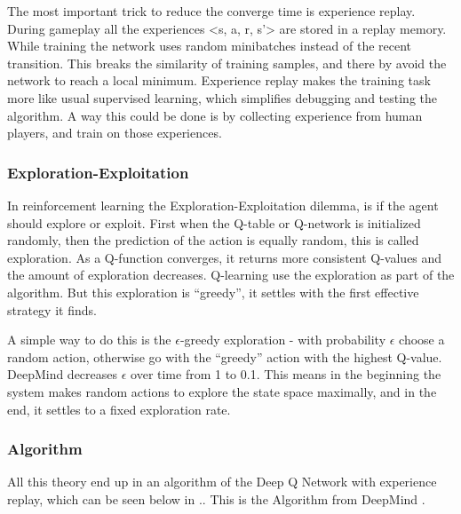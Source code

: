 The most important trick to reduce the converge time is experience replay. During gameplay all the experiences <s, a, r, s’> are stored in a replay memory. While training the network uses random minibatches instead of the recent transition. This breaks the similarity of training samples, and there by avoid the network to reach a local minimum. Experience replay makes the training task more like usual supervised learning, which simplifies debugging and testing the algorithm. A way this could be done is by collecting experience from human players, and train on those experiences.
  
\subsubsection{Exploration-Exploitation}
In reinforcement learning the Exploration-Exploitation dilemma, is if the agent should explore or exploit. First when the Q-table or Q-network is initialized randomly, then the prediction of the action is equally random, this is called exploration. As a Q-function converges, it returns more consistent Q-values and the amount of exploration decreases. Q-learning use the exploration as part of the algorithm. But this exploration is “greedy”, it settles with the first effective strategy it finds. 

A simple way to do this is the $\epsilon$-greedy exploration - with probability $\epsilon$ choose a random action, otherwise go with the “greedy” action with the highest Q-value. DeepMind decreases $\epsilon$ over time from 1 to 0.1. This means in the beginning the system makes random actions to explore the state space maximally, and in the end, it settles to a fixed exploration rate. 

\subsubsection{Algorithm}
All this theory end up in an algorithm of the Deep Q Network with experience replay, which can be seen below in .. This is the Algorithm from DeepMind \cite{DBLP:journals/corr/MnihKSGAWR13}.


